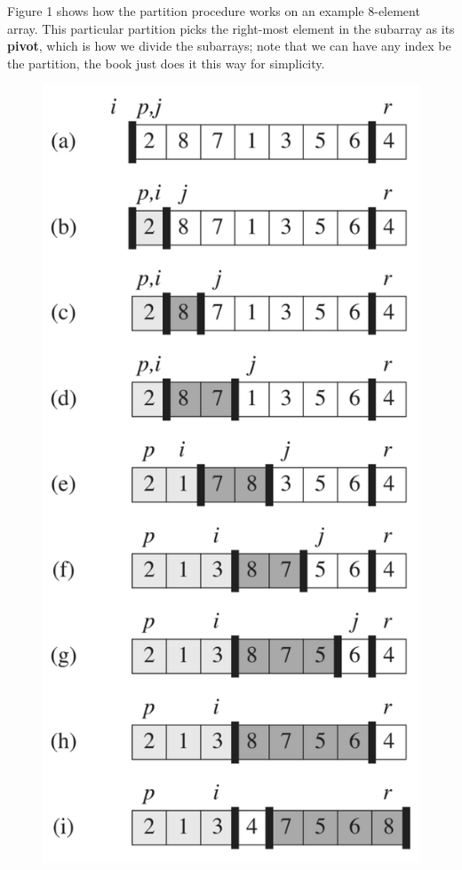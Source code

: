 \documentclass[12pt]{article}
\begin{document}
Figure 1 shows how the partition procedure works on an example 8-element array. This particular partition picks the right-most element in the subarray as its \textbf{pivot}, which is how we divide the subarrays; note that we can have any index be the partition, the book just does it this way for simplicity.

\begin{figure}[!ht]
\includegraphics[scale=0.45]{quicksort_example}

\end{figure}
\end{document}
